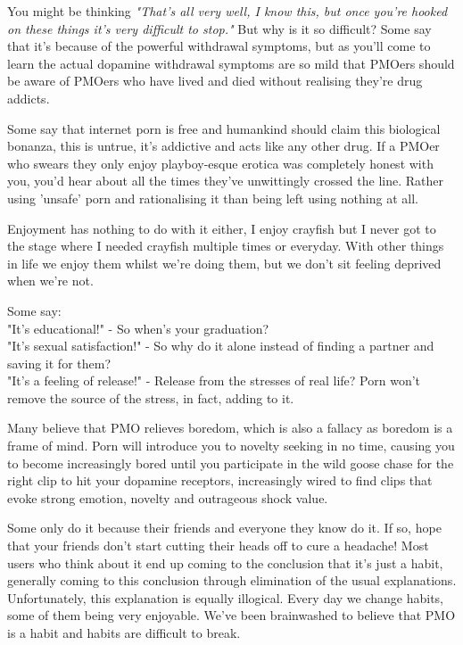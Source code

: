 \documentclass[easypeasy.tex]{subfiles}
\begin{document}
You might be thinking \textit{"That's all very well, I know this, but once you're hooked on these things it's very difficult to stop."} But why is it so difficult? Some say that it's because of the powerful withdrawal symptoms, but as you'll come to learn the actual dopamine withdrawal symptoms are so mild that PMOers should be aware of PMOers who have lived and died without realising they're drug addicts.

Some say that internet porn is free and humankind should claim this biological bonanza, this is untrue, it's addictive and acts like any other drug. If a PMOer who swears they only enjoy playboy-esque erotica was completely honest with you, you'd hear about all the times they've unwittingly crossed the line. Rather using 'unsafe' porn and rationalising it than being left using nothing at all.

Enjoyment has nothing to do with it either, I enjoy crayfish but I never got to the stage where I needed crayfish multiple times or everyday. With other things in life we enjoy them whilst we're doing them, but we don't sit feeling deprived when we're not.

Some say:\\
  "It's educational!" - So when's your graduation?\\
  "It's sexual satisfaction!" - So why do it alone instead of finding a partner and saving it for them?\\
  "It's a feeling of release!" - Release from the stresses of real life? Porn won't remove the source of the stress, in fact, adding to it.

Many believe that PMO relieves boredom, which is also a fallacy as boredom is a frame of mind. Porn will introduce you to novelty seeking in no time, causing you to become increasingly bored until you participate in the wild goose chase for the right clip to hit your dopamine receptors, increasingly wired to find clips that evoke strong emotion, novelty and outrageous shock value.

Some only do it because their friends and everyone they know do it. If so, hope that your friends don't start cutting their heads off to cure a headache! Most users who think about it end up coming to the conclusion that it's just a habit, generally coming to this conclusion through elimination of the usual explanations. Unfortunately, this explanation is equally illogical. Every day we change habits, some of them being very enjoyable. We've been brainwashed to believe that PMO is a habit and habits are difficult to break.
\end{document}
